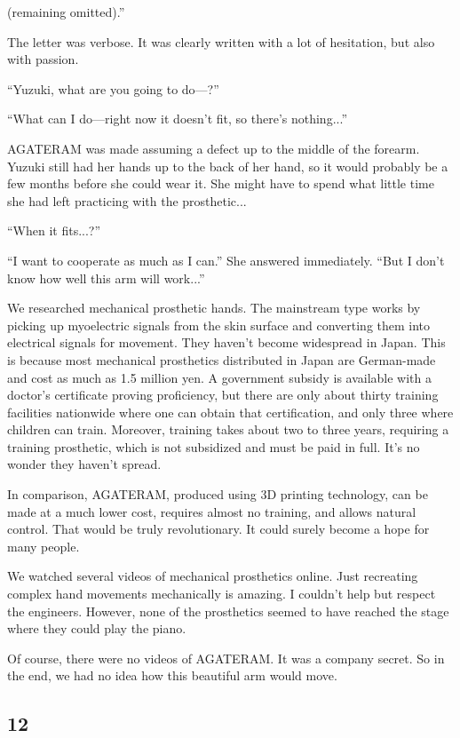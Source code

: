 \documentclass[
    a4paper,
    12pt,
    twoside,
    openany,
    UTF8,
    fontset=windows
]{ctexbook}
\begin{document}
(remaining omitted).''

The letter was verbose. It was clearly written with a lot of hesitation, but also with passion.

``Yuzuki, what are you going to do---?''

``What can I do---right now it doesn't fit, so there's nothing...''

AGATERAM was made assuming a defect up to the middle of the forearm. Yuzuki still had her hands up to the back of her hand, so it would probably be a few months before she could wear it. She might have to spend what little time she had left practicing with the prosthetic...

``When it fits...?''

``I want to cooperate as much as I can.'' She answered immediately. ``But I don't know how well this arm will work...''

We researched mechanical prosthetic hands. The mainstream type works by picking up myoelectric signals from the skin surface and converting them into electrical signals for movement. They haven't become widespread in Japan. This is because most mechanical prosthetics distributed in Japan are German-made and cost as much as 1.5 million yen. A government subsidy is available with a doctor's certificate proving proficiency, but there are only about thirty training facilities nationwide where one can obtain that certification, and only three where children can train. Moreover, training takes about two to three years, requiring a training prosthetic, which is not subsidized and must be paid in full. It's no wonder they haven't spread.

In comparison, AGATERAM, produced using 3D printing technology, can be made at a much lower cost, requires almost no training, and allows natural control. That would be truly revolutionary. It could surely become a hope for many people.

We watched several videos of mechanical prosthetics online. Just recreating complex hand movements mechanically is amazing. I couldn't help but respect the engineers. However, none of the prosthetics seemed to have reached the stage where they could play the piano.

Of course, there were no videos of AGATERAM. It was a company secret. So in the end, we had no idea how this beautiful arm would move.


\subsection*{12}
\end{document}

